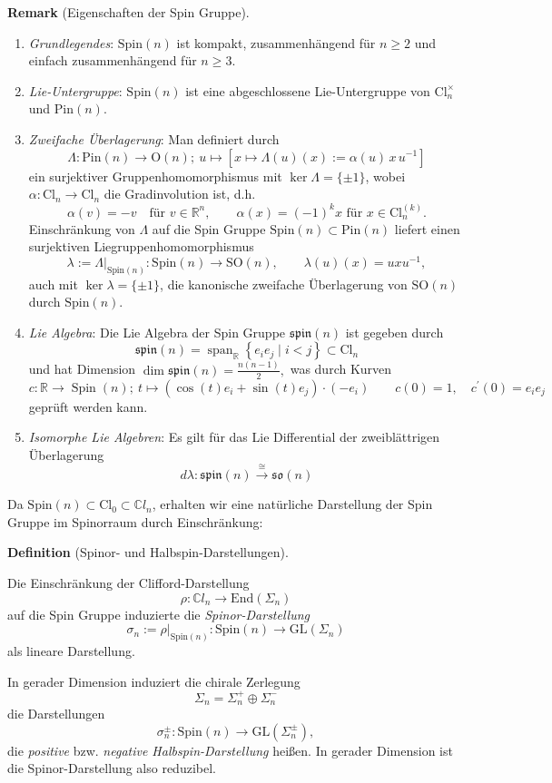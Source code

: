 \documentclass[10pt, letterpaper]{article}
\newcommand{\R}{\mathbb{R}}
\newcommand{\C}{\mathbb{C}}
\newcommand{\End}{\mathrm{End}}
\newcommand{\Cl}{\mathrm{Cl}}
\newcommand{\GL}{\mathrm{GL}}
\newcommand{\SO}{\mathrm{SO}}
\newcommand{\Spin}{\mathrm{Spin}}
\newcommand{\Pin}{\mathrm{Pin}}
\newcommand{\CustomHeading}[3]{%
  \par\medskip\noindent%
  \textbf{#1 #2} \textnormal{(#3)}.\enskip%
}
\newenvironment{DEF}[2]{\CustomHeading{Definition}{#1}{#2}}{}
\newenvironment{REM}[2]{\CustomHeading{Remark}{#1}{#2}}{}
\begin{document}
\begin{REM}{}{Eigenschaften der Spin Gruppe}
  \begin{enumerate}
    \item \emph{Grundlegendes}: $\Spin(n)$ ist kompakt, zusammenhängend für $n\geq 2$ und einfach zusammenhängend für $n\geq 3$.
    \item \emph{Lie-Untergruppe}: $\Spin(n)$ ist eine abgeschlossene Lie-Untergruppe von $\Cl_n^\times$ und $\Pin(n)$.
    \item \emph{Zweifache Überlagerung}: Man definiert durch  
    \[
    \Lambda:\Pin(n)\to \mathrm{O}(n);\ u\mapsto [x\mapsto \Lambda(u)(x):=\alpha(u)\,x\,u^{-1}]
    \]
    ein surjektiver Gruppenhomomorphismus mit $\ker\Lambda=\{\pm 1\}$, wobei $\alpha:\Cl_n\to\Cl_n$ die Gradinvolution ist, d.h.
    \[
    \alpha(v)=-v \quad \text{für } v\in \R^n,
    \qquad
    \alpha(x)=(-1)^k x \text{ für } x\in \Cl_n^{(k)}.
    \]
    Einschränkung von $\Lambda$ auf die Spin Gruppe $\Spin(n)\subset\Pin(n)$ liefert einen surjektiven Liegruppenhomomorphismus
    \[
    \lambda:=\Lambda|_{\Spin(n)}:\Spin(n)\to \SO(n),
    \qquad
    \lambda(u)(x)=u x u^{-1},
    \]
    auch mit $\ker\lambda=\{\pm 1\}$, die kanonische zweifache Überlagerung von $\SO(n)$ durch $\Spin(n)$.
    \item \emph{Lie Algebra}: Die Lie Algebra der Spin Gruppe $\mathfrak{spin}(n)$ ist gegeben durch
    $$\mathfrak{spin}(n)=\operatorname{span}_{\mathbb{R}}\left\{e_i e_j \mid i<j\right\} \subset \mathrm{Cl}_n$$
    und hat Dimension $\dim \mathfrak{spin}(n)=\frac{n(n-1)}{2},$
    was durch Kurven 
    $$c: \mathbb{R} \rightarrow \operatorname{Spin}(n);\ t \mapsto\left(\cos (t) e_i+\sin (t) e_j\right) \cdot\left(-e_i\right) \qquad c(0)=1, \quad c^{\prime}(0)=e_i e_j$$
    geprüft werden kann.
    \item \emph{Isomorphe Lie Algebren}: Es gilt für das Lie Differential der zweiblättrigen Überlagerung
    $$d\lambda:\mathfrak{spin}(n)\overset{\cong}{\longrightarrow}\mathfrak{so}(n)$$
    
  \end{enumerate}
\end{REM}

\bigskip

Da $\Spin(n)\subset \Cl_0\subset\C l_n$, erhalten wir eine natürliche Darstellung der Spin Gruppe im Spinorraum durch Einschränkung:

\begin{DEF}{}{Spinor- und Halbspin-Darstellungen}
Die Einschränkung der Clifford-Darstellung 
$$\rho: \C l_n\to \End (\Sigma_n)$$
auf die Spin Gruppe induzierte die \emph{Spinor-Darstellung}
\[
\sigma_n:=\rho|_{\Spin(n)}:\Spin(n)\to \GL(\Sigma_n)
\]
als lineare Darstellung.

In gerader Dimension induziert die chirale Zerlegung
\[
\Sigma_n=\Sigma_n^+\oplus \Sigma_n^-
\]
die Darstellungen
\[
\sigma_n^\pm:\Spin(n)\to \GL(\Sigma_n^\pm),
\]
die \emph{positive} bzw. \emph{negative Halbspin-Darstellung} heißen. In gerader Dimension ist die Spinor-Darstellung also reduzibel.
\end{DEF}
\end{document}
